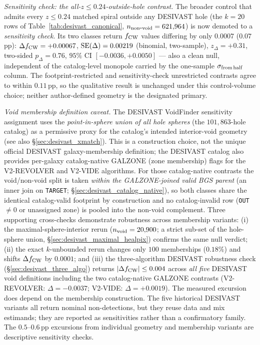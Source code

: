 \documentclass[aps,prd,twocolumn,superscriptaddress,showpacs,preprintnumbers,nofootinbib,longbibliography,floatfix]{revtex4-2}
\begin{document}
\emph{Sensitivity check: the all-$z\le0.24$-outside-hole contrast.}
The broader control that admits every $z \le 0.24$ matched spiral
outside any DESIVAST hole (the $k=20$ rows of
Table~\ref{tab:desivast_canonical}, $n_{\rm non\mbox{-}void} =
621{,}964$) is now demoted to a \emph{sensitivity check}. Its two
classes return $f_{\rm CW}$ values differing by only $0.0007$
($0.07$\,pp): $\Delta f_{\rm CW} = +0.00067$, ${\rm SE}(\Delta) =
0.00219$ (binomial, two-sample), $z_\Delta = +0.31$, two-sided
$p_\Delta = 0.76$, $95\%$ CI $[-0.0036, +0.0050]$ --- also a clean null,
independent of the catalog-level monopole carried by the one-sample
$\sigma_{\rm from\,half}$ column. The footprint-restricted and
sensitivity-check unrestricted contrasts agree to within $0.11$\,pp,
so the qualitative result is unchanged under this control-volume
choice; neither author-defined geometry is the designated primary.

\emph{Void membership definition caveat.}
The DESIVAST VoidFinder sensitivity assignment uses the
\emph{point-in-sphere union of all hole spheres} (the $101{,}863$-hole
catalog) as a permissive proxy for the catalog's intended interior-void
geometry (see also \S\ref{sec:desivast_xmatch}). This is a construction
choice, not the unique official DESIVAST galaxy-membership definition;
the DESIVAST catalog also provides per-galaxy catalog-native GALZONE
(zone membership) flags for the V2-REVOLVER and V2-VIDE algorithms.
For those catalog-native contrasts the void/non-void split is taken
\emph{within the GALZONE-joined valid BGS parent} (an inner join on
\texttt{TARGET}; \S\ref{sec:desivast_catalog_native}), so both classes
share the identical catalog-valid footprint by construction and no
catalog-invalid row (\texttt{OUT}$\neq0$ or unassigned zone) is pooled
into the non-void complement.
Three supporting cross-checks demonstrate robustness across membership
variants: (i) the maximal-sphere-interior rerun ($n_{\rm void} = 20{,}900$;
a strict sub-set of the hole-sphere union, \S\ref{sec:desivast_maximal_healpix})
confirms the same null verdict; (ii) the exact $k$-unbounded rerun
changes only $100$ memberships ($0.18\%$) and shifts $\Delta f_{\rm CW}$
by $0.0001$; and (iii) the three-algorithm DESIVAST robustness check
(\S\ref{sec:desivast_three_algo}) returns $|\Delta f_{\rm CW}| \le 0.004$
across \emph{all five} DESIVAST void definitions including the two
catalog-native GALZONE contrasts (V2-REVOLVER: $\Delta = -0.0037$;
V2-VIDE: $\Delta = +0.0019$). The measured excursion does depend on the
membership construction. The five historical DESIVAST variants all
return nominal non-detections, but they reuse data and mix estimands;
they are reported as sensitivities rather than a confirmatory family.
The $0.5$--$0.6$\,pp excursions from individual geometry and membership
variants are descriptive sensitivity checks.
\end{document}
